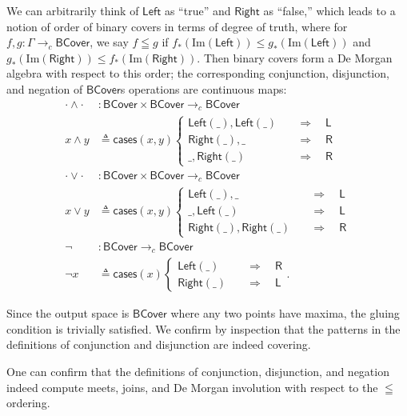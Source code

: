 \documentclass[conference]{IEEEtran}
\newcommand{\cto}{\to_c}
\newcommand{\wildcard}{\_}
\newcommand{\Img}[1]{\text{Im}\left({#1}\right)}
\newcommand{\Branch}{\Rightarrow}
\newcommand{\BCover}{\mathsf{BCover}}
\begin{document}
We can arbitrarily think of $\mathsf{Left}$ as ``true'' and $\mathsf{Right}$ as ``false,'' which leads to a notion of order of binary covers in terms of degree of truth, where for $f, g : \Gamma \cto \BCover$, we say $f \leqq g$ if $f_*(\Img{\mathsf{Left}}) \le g_*(\Img{\mathsf{Left}})$ and $g_*(\Img{\mathsf{Right}}) \le f_*(\Img{\mathsf{Right}})$. Then binary covers form a De Morgan algebra with respect to this order; the corresponding conjunction, disjunction, and negation of $\BCover$s operations are continuous maps:
\begin{align*}
\cdot \wedge \cdot &: \BCover \times \BCover \cto \BCover
\\ x \wedge y &\triangleq \mathsf{cases}(x, y)
\begin{cases}
\mathsf{Left}(\wildcard), \mathsf{Left}(\wildcard)
 \quad &\Branch \quad
 \mathsf{L}
\\
\mathsf{Right}(\wildcard), \wildcard
 \quad &\Branch \quad
 \mathsf{R}
\\
\wildcard, \mathsf{Right}(\wildcard)
 \quad &\Branch \quad
 \mathsf{R}
\end{cases}
\\
\cdot \vee \cdot &: \BCover \times \BCover \cto \BCover
\\ x \vee y &\triangleq \mathsf{cases}(x, y)
\begin{cases}
\mathsf{Left}(\wildcard), \wildcard
 \quad &\Branch \quad
 \mathsf{L}
\\
\wildcard, \mathsf{Left}(\wildcard)
 \quad &\Branch \quad
 \mathsf{L}
\\
 \mathsf{Right}(\wildcard), \mathsf{Right}(\wildcard)
 \quad &\Branch \quad
 \mathsf{R}
\end{cases}
\\
\neg &: \BCover \cto \BCover
\\ \neg x &\triangleq \mathsf{cases}(x)
\begin{cases}
\mathsf{Left}(\wildcard)
 \quad &\Branch \quad
 \mathsf{R}
\\
\mathsf{Right}(\wildcard)
 \quad &\Branch \quad
 \mathsf{L}
\end{cases}.
\end{align*}

Since the output space is $\BCover$ where any two points have maxima, the gluing condition is trivially satisfied. We confirm by inspection that the patterns in the definitions of conjunction and disjunction are indeed covering.

One can confirm that the definitions of conjunction, disjunction, and negation indeed compute meets, joins, and De Morgan involution with respect to the $\leqq$ ordering.
\end{document}
